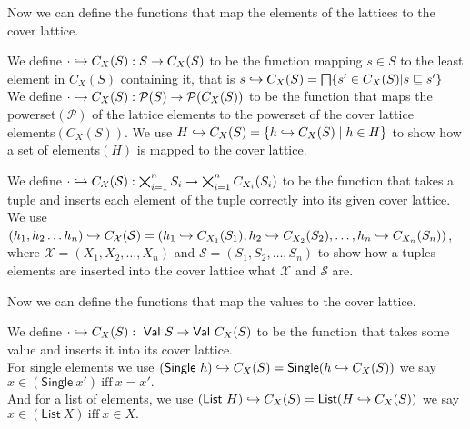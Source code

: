 Now we can define the functions that map the elements of the lattices to the cover lattice.

\begin{definition}
    We define $\cdot \hookrightarrow C_X(S):S\rightarrow C_X(S)$ to be the function mapping $s\in S$ to the least element in $C_X(S)$ containing it, that is $s \into C_X(S)=\bigsqcap\{s'\in C_X(S)|s\sqsubseteq s'\}$
    \\

    We define $\cdot \hookrightarrow C_X(S):\mathcal{P}(S)\rightarrow \mathcal{P}(C_X(S))$ to be the function that maps the powerset$(\mathcal{P})$ of the lattice elements to the powerset of the cover lattice elements$(C_X (S))$.
    We use $H \hookrightarrow C_X (S) = \{h \hookrightarrow C_X (S) \mid h \in H\}$ to show how a set of elements$(H)$ is mapped to the cover lattice.
\end{definition}

\begin{definition}
    We define $\cdot \hookrightarrow C_\mathcal{X}(\mathcal{S}): \bigtimes_{i = 1}^{n} S_i \rightarrow \bigtimes_{i = 1}^{n} C_{X_i}(S_i)$ to be the function that takes a tuple and inserts each element of the tuple correctly into its given cover lattice.
    We use $(h_1, h_2 \dots h_n)\hookrightarrow C_{\mathcal{X}}(\mathcal{S})=(h_1 \hookrightarrow C_{X_1}(S_1), h_2\hookrightarrow C_{X_2}(S_2), \dots, h_n \hookrightarrow C_{X_n}(S_n))$, where $\mathcal{X}=(X_1, X_2, \dots, X_n)$ and $\mathcal{S}=(S_1, S_2, \dots, S_n)$ to show how a tuples elements are inserted into the cover lattice what $\mathcal{X}$ and $\mathcal{S}$ are.
\end{definition}

Now we can define the functions that map the values to the cover lattice.

\begin{definition}
    We define $\cdot \into C_X(S): \ \mathsf{Val} \ S \rightarrow \mathsf{Val} \ C_X(S)$ to be the function that takes some value and inserts it into its cover lattice. \\
    For single elements we use $(\mathsf{Single} \ h) \into C_X(S) = \mathsf{Single}(h\into C_X(S)) \\$
    we say $x \in (\mathsf{Single} \ x') \ \text{iff} \ x = x'.$ \\
    And for a list of elements, we use $(\mathsf{List} \ H) \hookrightarrow C_X(S)=\mathsf{List}(H\hookrightarrow C_X(S))\\$
    we say $x \in (\mathsf{List} \ X) \ \text{iff} \ x \in X.$
\end{definition}

